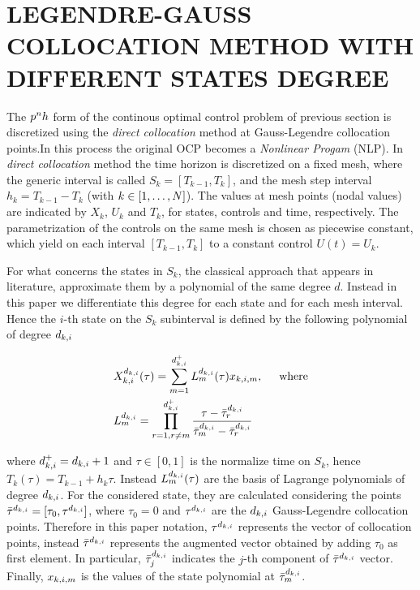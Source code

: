 \section*{LEGENDRE-GAUSS COLLOCATION METHOD WITH DIFFERENT STATES DEGREE}
The $p^{n}h$ form of the continous optimal control problem of previous section is discretized using the \emph{direct collocation} method at Gauss-Legendre collocation points.In this process the original OCP becomes a \emph{Nonlinear Progam} (NLP). In \emph{direct collocation} method the time horizon is discretized on a fixed mesh, where the generic interval is called $S_{k} = [T_{k-1}, T_{k}]$, and the mesh step interval $h_{k} = T_{k-1} - T_{k}$ (with $k \in [1,\dots,N]$). The values at mesh points (nodal values) are indicated by $X_{k}$, $U_{k}$ and $T_{k}$, for  states, controls and time, respectively.
The parametrization of the controls on the same mesh is chosen as piecewise constant, which yield on each interval $[T_{k-1}, T_{k}]$ to a constant control $U(t) = U_{k}$.

For what concerns the states in $S_{k}$, the classical approach that appears in literature, approximate them by a polynomial of the same degree $d$.
Instead in this paper we differentiate this degree for each state and for each mesh interval. Hence the $i$-th state on the $S_{k}$ subinterval is defined by the following polynomial of degree $d_{k,i}$

\begin{subequations}
	\begin{align}
	&X_{k,i}^{d_{k,i}} (\tau) = \sum_{m=1}^{d_{k,i}^{+}} L_{m}^{d_{k,i}}(\tau)x_{k,i,m}, \hspace{5mm} \text{where} \label{Xpoly}\\
	&L_{m}^{d_{k,i}} = \prod_{r=1, r\neq m}^{d_{k,i}^{+}} \dfrac{\tau - \bar{\tau}^{d_{k,i}}_{r}}{\bar{\tau}^{d_{k,i}}_{m} - \bar{\tau}^{d_{k,i}}_{r}} \label{BLagrange}
	\end{align}
\end{subequations}

where $d_{k,i}^{+} = d_{k,i} + 1$ and $\tau \in [0,1]$ is the normalize time on $S_k$, hence $T_k(\tau) = T_{k-1} + h_k\tau$.
Instead $L_{m}^{d_{k,i}} (\tau)$ are the basis of Lagrange polynomials of degree $d_{k,i}$. For the considered state, they are calculated considering the points $\bar{\tau}^{d_{k,i}} = [\tau_{0}, \tau^{d_{k,i}}]$, where $\tau_{0} = 0$ and $\tau^{d_{k,i}}$ are the $d_{k,i}$ Gauss-Legendre collocation points. Therefore in this paper notation, $\tau^{d_{k,i}}$  represents the vector of collocation points, instead $\bar{\tau}^{d_{k,i}}$ represents the augmented vector obtained by adding $\tau_{0}$ as first element.
In particular, $\bar{\tau}^{d_{k,i}}_{j}$ indicates the $j$-th component of $\bar{\tau}^{d_{k,i}}$ vector.
Finally, $x_{k,i,m}$ is the values of the state polynomial at $\bar{\tau}^{d_{k,i}}_{m}$.

